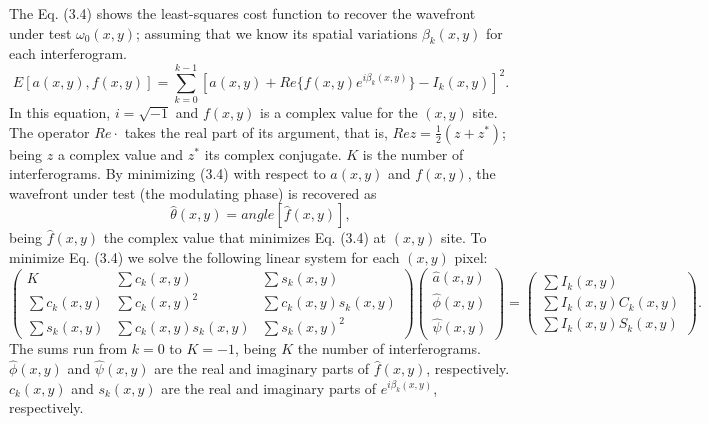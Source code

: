 The Eq. (3.4) shows the least-squares cost function to recover the wavefront
under test $\omega_0(x,y)$; assuming that we know its spatial variations
$\beta_k(x,y)$ for each interferogram.
\begin{equation}
  E[a(x,y),f(x,y)]=\sum_{k=0}^{k-1}[a(x,y) + Re\{f(x,y) e^{i\beta_k (x,y)} \} -
I_k (x,y)]^2.
\end{equation}
In this equation, $i = \sqrt{-1}$ and $f(x,y)$ is a complex value for the
$(x,y)$ site. The operator $Re{\cdot}$ takes the real part of its argument,
that is, $Re{z} = \frac{1}{2} (z+z^*)$; being $z$ a complex value and $z^*$
its complex conjugate. $K$ is the number of interferograms. By minimizing (3.4)
with respect to $a(x,y)$ and $f(x,y)$, the wavefront under test (the modulating
phase) is recovered as
\begin{equation}
 \hat{\theta}(x,y)=angle[\hat{f}(x,y)],
\end{equation}
being $\hat{f}(x,y)$ the complex value that minimizes Eq. (3.4) at $(x,y)$ site.
To minimize Eq. (3.4) we solve the following linear system for each $(x,y)$
pixel:
\begin{equation}
\left(\begin{array}{ccc}
K & \sum c_{k}(x,y) & \sum s_{k}(x,y)\\
\sum c_{k}(x,y) & \sum c_{k}(x,y)^{2} & \sum c_{k}(x,y)s_{k}(x,y)\\
\sum s_{k}(x,y) & \sum c_{k}(x,y)s_{k}(x,y) & \sum s_{k}(x,y)^{2}
\end{array}\right)\left(\begin{array}{c}
\hat{a}(x,y)\\
\hat{\phi}(x,y)\\
\hat{\psi}(x,y)
\end{array}\right)=\left(\begin{array}{c}
\sum I_{k}(x,y)\\
\sum I_{k}(x,y)C_{k}(x,y)\\
\sum I_{k}(x,y)S_{k}(x,y)
\end{array}\right).
\end{equation}
The sums run from $k = 0$ to $K=-1$, being $K$ the number of interferograms.
$\hat{\phi}(x,y)$ and $\hat{\psi}(x,y)$ are the real and imaginary parts of 
$\hat{f}(x,y)$, respectively. $c_k(x,y)$ and $s_k(x,y)$ are the real and
imaginary parts of $e^{i\beta_k(x,y)}$, respectively.

